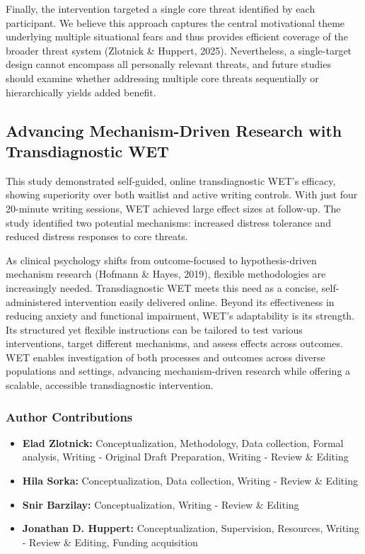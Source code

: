 \documentclass[
  man,floatsintext]{apa7}
\providecommand{\tightlist}{%
  \setlength{\itemsep}{0pt}\setlength{\parskip}{0pt}}
\begin{document}
Finally, the intervention targeted a single core threat identified by each participant.
We believe this approach captures the central motivational theme underlying multiple situational fears and thus provides efficient coverage of the broader threat system (Zlotnick \& Huppert, 2025).
Nevertheless, a single-target design cannot encompass all personally relevant threats, and future studies should examine whether addressing multiple core threats sequentially or hierarchically yields added benefit.

\subsection{Advancing Mechanism-Driven Research with Transdiagnostic WET}\label{advancing-mechanism-driven-research-with-transdiagnostic-wet}

This study demonstrated self-guided, online transdiagnostic WET's efficacy, showing superiority over both waitlist and active writing controls.
With just four 20-minute writing sessions, WET achieved large effect sizes at follow-up.
The study identified two potential mechanisms: increased distress tolerance and reduced distress responses to core threats.

As clinical psychology shifts from outcome-focused to hypothesis-driven mechanism research (Hofmann \& Hayes, 2019), flexible methodologies are increasingly needed.
Transdiagnostic WET meets this need as a concise, self-administered intervention easily delivered online.
Beyond its effectiveness in reducing anxiety and functional impairment, WET's adaptability is its strength.
Its structured yet flexible instructions can be tailored to test various interventions, target different mechanisms, and assess effects across outcomes.
WET enables investigation of both processes and outcomes across diverse populations and settings, advancing mechanism-driven research while offering a scalable, accessible transdiagnostic intervention.

\newpage

\subsubsection{Author Contributions}\label{author-contributions}

\begin{itemize}
\tightlist
\item
  \textbf{Elad Zlotnick:} Conceptualization, Methodology, Data collection, Formal analysis, Writing - Original Draft Preparation, Writing - Review \& Editing
\item
  \textbf{Hila Sorka:} Conceptualization, Data collection, Writing - Review \& Editing
\item
  \textbf{Snir Barzilay:} Conceptualization, Writing - Review \& Editing
\item
  \textbf{Jonathan D. Huppert:} Conceptualization, Supervision, Resources, Writing - Review \& Editing, Funding acquisition
\end{itemize}
\end{document}
